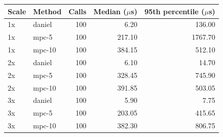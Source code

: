 \begin{tabular}{llrrr}
\toprule
Scale & Method & Calls & Median ($\mu$s) & 95th percentile ($\mu$s) \\ \midrule
1x & daniel & 100 & 6.20 & 136.00 \\ 
1x & mpc-5 & 100 & 217.10 & 1767.70 \\ 
1x & mpc-10 & 100 & 384.15 & 512.10 \\ 
2x & daniel & 100 & 6.10 & 14.70 \\ 
2x & mpc-5 & 100 & 328.45 & 745.90 \\ 
2x & mpc-10 & 100 & 391.85 & 503.05 \\ 
3x & daniel & 100 & 5.90 & 7.75 \\ 
3x & mpc-5 & 100 & 203.05 & 415.65 \\ 
3x & mpc-10 & 100 & 382.30 & 806.75 \\ 
\bottomrule
\end{tabular}
